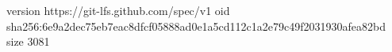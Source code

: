 version https://git-lfs.github.com/spec/v1
oid sha256:6e9a2dec75eb7eac8dfcf05888ad0e1a5cd112c1a2e79c49f2031930afea82bd
size 3081
